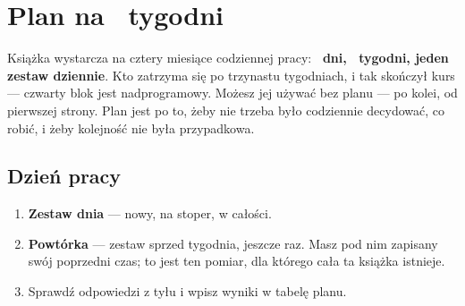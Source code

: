 %
%



\chapter*{Plan na \btplantyg\ tygodni}

Książka wystarcza na cztery miesiące codziennej pracy: \textbf{\btplandni{}~dni,
\btplantyg{}~tygodni, jeden zestaw dziennie}. Kto zatrzyma się po trzynastu
tygodniach, i tak skończył kurs — czwarty blok jest nadprogramowy. Możesz jej używać bez planu — po kolei, od pierwszej
strony. Plan jest po to, żeby nie trzeba było codziennie decydować, co robić,
i żeby kolejność nie była przypadkowa.

\section*{Dzień pracy}

\begin{enumerate}
  \item \textbf{Zestaw dnia} — nowy, na stoper, w całości.
  \item \textbf{Powtórka} — zestaw sprzed tygodnia, jeszcze raz. Masz pod nim
        zapisany swój poprzedni czas; to jest ten pomiar, dla którego cała ta
        książka istnieje.
  \item Sprawdź odpowiedzi z tyłu i wpisz wyniki w tabelę planu.
\end{enumerate}

